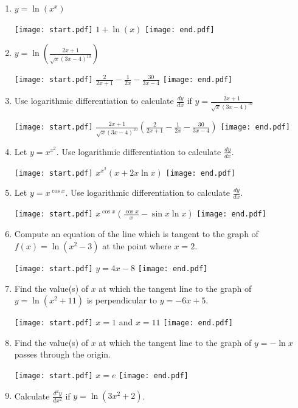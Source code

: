 \documentclass[12pt]{article}
\begin{document}
\begin{enumerate}
\item $y=\ln{\left(x^x\right)}$

\texttt{[image: start.pdf]}
{{$1+\ln(x)$}}
\texttt{[image: end.pdf]}


\item $y=\ln{\left(\frac{2x+1}{\sqrt{x}(3x-4)^{10}}\right)}$

\texttt{[image: start.pdf]}
{{$\frac{2}{2x+1}-\frac{1}{2x}-\frac{30}{3x-4}$}}
\texttt{[image: end.pdf]}


\item Use logarithmic differentiation to calculate $\frac{dy}{dx}$ if $y=\frac{2x+1}{\sqrt{x}(3x-4)^{10}}$

\texttt{[image: start.pdf]}
{{$\frac{2x+1}{\sqrt{x}(3x-4)^{10}}\left(\frac{2}{2x+1}-\frac{1}{2x}-\frac{30}{3x-4}\right)$}}
\texttt{[image: end.pdf]}


\item Let $y=x^{x^2}$.  Use logarithmic differentiation to calculate $\frac{dy}{dx}$.

\texttt{[image: start.pdf]}
{{$x^{x^2}(x+2x\ln{x})$}}
\texttt{[image: end.pdf]}


\item Let $y=x^{\cos{x}}$.  Use logarithmic differentiation to calculate $\frac{dy}{dx}$.

\texttt{[image: start.pdf]}
{{$x^{\cos{x}}\left(\frac{\cos{x}}{x}-\sin{x}\ln{x}\right)$}}
\texttt{[image: end.pdf]}



\item Compute an equation of the line which is tangent to the graph of $f(x)=\ln{(x^2-3)}$ at the point where $x=2$.

\texttt{[image: start.pdf]}
{{$y=4x-8$}}
\texttt{[image: end.pdf]}


\item Find the value(s) of $x$ at which the tangent line to the graph of $y=\ln{(x^2+11)}$  is perpendicular to $y=-6x+5$.

\texttt{[image: start.pdf]}
{{$x=1$ and $x=11$}}
\texttt{[image: end.pdf]}


\item Find the value(s) of $x$ at which the tangent line to the graph of $y=-\ln{x}$ passes through the origin.

\texttt{[image: start.pdf]}
{{$x=e$}}
\texttt{[image: end.pdf]}


\item Calculate $\frac{d^2y}{dx^2}$ if $y=\ln{(3x^2+2)}$.


\end{enumerate}
\end{document}
